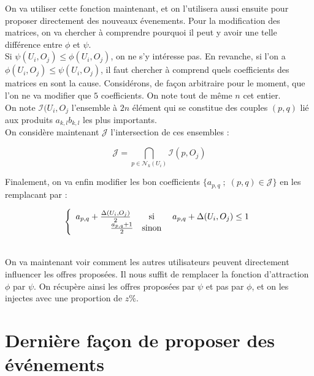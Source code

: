 \documentclass[11pt, oneside]{article}
\begin{document}
On va utiliser cette fonction maintenant, et on l'utilisera aussi ensuite pour proposer directement des nouveaux évenements. Pour la modification des matrices, on va chercher à comprendre pourquoi il peut y avoir une telle différence entre $\phi$ et $\psi$. \\
 Si $\psi(U_i,O_j) \leq \phi(U_i,O_j)$, on ne s'y intéresse pas. En revanche, si l'on a $\phi(U_i,O_j) \leq \psi(U_i,O_j)$, il faut chercher à comprend quels coefficients des matrices en sont la cause. Considérons, de façon arbitraire pour le moment, que l'on ne va modifier que $5$ coefficients. On note tout de même $n$ cet entier. \\
On note $\mathcal{I} (U_i,O_j$ l'ensemble à $2n$ élément qui se constitue des couples $(p,q)$ lié aux produits $a_{k,l}b_{k,l} $ les plus importants. \\
On considère maintenant $\mathcal{J}$ l'intersection de ces ensembles : 
\begin{center}
\[
\mathcal{J} = \bigcap _{p \in \mathcal{N} _k (U_i) } \mathcal{I} (p,O_j) 
\]

\end{center}

Finalement, on va enfin modifier les bon coefficients $\{a_{p,q} \; ; \; (p,q) \in \mathcal{J} \} $ en les remplacant par :
\begin{center}
\[
 \left \{
   \begin{array}{r c l}
       a_{p,q} + \frac{\Delta (U_i,O_j)}{2} \;  &\text{si}& \; a_{p,q} + \Delta (U_i,O_j) \leq 1  \\
       \frac{ a_{p,q} + 1}{2} &\text{sinon}& \\
   \end{array}
   \right .  
\]
\end{center} 
\\ 

On va maintenant voir comment les autres utilisateurs peuvent directement influencer les offres proposées. Il nous suffit de remplacer la fonction d'attraction $\phi$ par $\psi$. On récupère ainsi les offres proposées par $\psi$ et pas par $\phi$, et on les injectes avec une proportion de $z \%$. 

\section{Dernière façon de proposer des événements}
\end{document}
